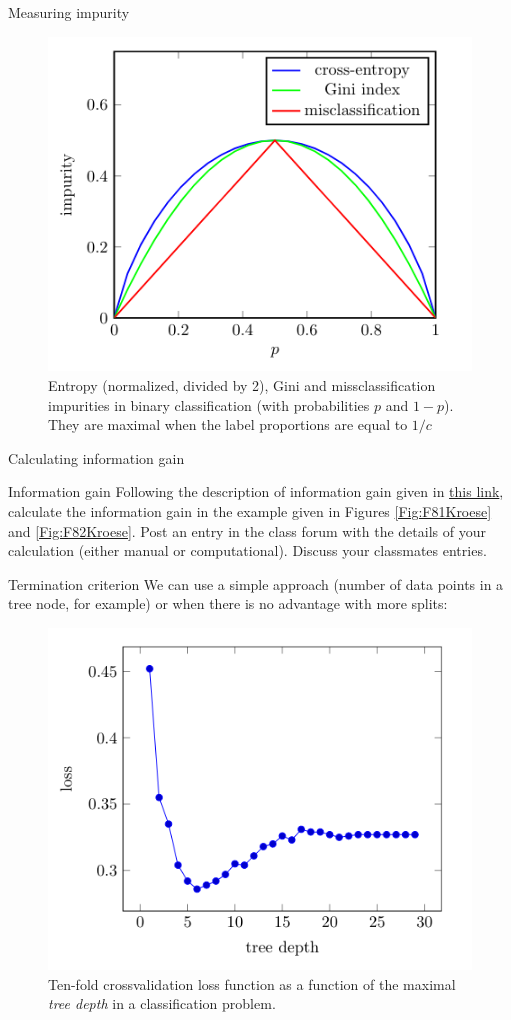 \documentclass{beamer}
\begin{document}
\begin{frame}{Measuring impurity}
    \begin{figure}
        \includegraphics[width=0.6\linewidth]{F83Kroese}
        \caption{Entropy (normalized, divided by 2), Gini and missclassification impurities in binary classification (with probabilities $p$ and $1-p$). They are maximal when the label proportions are equal to $1/c$\cite{kroese2020}}
    \end{figure}
\end{frame}


\begin{frame}{Calculating information gain}
    
    \begin{Exercise}{Information gain}
        Following the description of information gain given in \href{https://towardsdatascience.com/decision-trees-explained-entropy-information-gain-gini-index-ccp-pruning-4d78070db36c}{this link}, calculate the information gain in the example given in Figures \ref{Fig:F81Kroese} and \ref{Fig:F82Kroese}. Post an entry in the class forum with the details of your calculation (either manual or computational). Discuss your classmates entries.
    \end{Exercise}

\end{frame}

\begin{frame}{Termination criterion}
    We can use a simple approach (number of data points in a tree node, for example) or when there is no advantage with more splits:
    \begin{figure}
        \includegraphics[width=0.7\linewidth]{F84Kroese}
        \caption{Ten-fold crossvalidation loss function as a function of the maximal {\em tree depth} in a classification problem.\cite{kroese2020}}
    \end{figure}
\end{frame}
\end{document}
